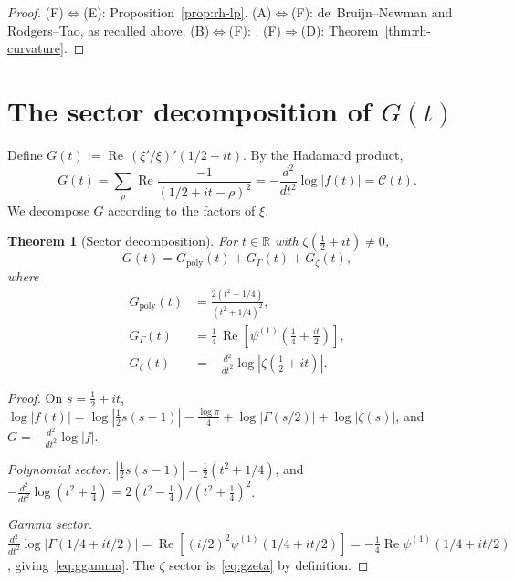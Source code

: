 \documentclass[11pt]{amsart}
\newtheorem{theorem}{Theorem}[section]
\renewcommand{\Re}{\operatorname{Re}}
\begin{document}
\begin{proof}
(F)$\iff$(E): Proposition~\ref{prop:rh-lp}.
(A)$\iff$(F): de~Bruijn--Newman and Rodgers--Tao, as recalled above.
(B)$\iff$(F): \cite[Thm.~2.2, Def.~2.3]{P25}.
(F)$\Rightarrow$(D): Theorem~\ref{thm:rh-curvature}.
\end{proof}

\section{The sector decomposition of \texorpdfstring{$G(t)$}{G(t)}}
\label{sec:sectors}

Define $G(t) := \Re\,(\xi'/\xi)'(1/2+it)$. By the Hadamard product,
\[
  G(t)=\sum_\rho\Re\frac{-1}{(1/2+it-\rho)^2}=-\frac{d^2}{dt^2}\log|f(t)|=\mathcal C(t).
\]
We decompose $G$ according to the factors of $\xi$.

\begin{theorem}[Sector decomposition]\label{thm:sectors}
For $t\in\mathbb R$ with $\zeta(\tfrac12+it)\neq0$,
\[
  G(t) = G_{\mathrm{poly}}(t) + G_\Gamma(t) + G_\zeta(t),
\]
where
\begin{align}
  G_{\mathrm{poly}}(t) &= \frac{2(t^2-1/4)}{(t^2+1/4)^2}, \label{eq:gpoly}\\[4pt]
  G_\Gamma(t) &= \tfrac{1}{4}\,\Re\!\left[\psi^{(1)}\!\left(\tfrac{1}{4}+\tfrac{it}{2}\right)\right],
  \label{eq:ggamma}\\[4pt]
  G_\zeta(t) &= -\frac{d^2}{dt^2}\log|\zeta\!\left(\tfrac{1}{2}+it\right)|.
  \label{eq:gzeta}
\end{align}
\end{theorem}

\begin{proof}
On $s=\tfrac12+it$,
$\log|f(t)| = \log|\tfrac{1}{2}s(s-1)| - \tfrac{\log\pi}{4} + \log|\Gamma(s/2)| + \log|\zeta(s)|$,
and $G=-\frac{d^2}{dt^2}\log|f|$.

\medskip\noindent\textit{Polynomial sector.} $|\tfrac{1}{2}s(s-1)| = \tfrac{1}{2}(t^2+1/4)$,
and $-\frac{d^2}{dt^2}\log(t^2+\tfrac14)=2(t^2-\tfrac14)/(t^2+\tfrac14)^2$.

\medskip\noindent\textit{Gamma sector.} $\frac{d^2}{dt^2}\log|\Gamma(1/4+it/2)| =
\Re[(i/2)^2\psi^{(1)}(1/4+it/2)] = -\tfrac{1}{4}\Re\psi^{(1)}(1/4+it/2)$, giving~\eqref{eq:ggamma}.
The $\zeta$ sector is~\eqref{eq:gzeta} by definition.
\end{proof}
\end{document}
